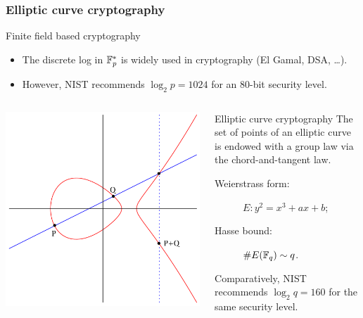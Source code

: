 \documentclass[10pt]{beamer}
\begin{document}
{
\begin{frame}
  \frametitle{Elliptic curve cryptography}

  \begin{block}{Finite field based cryptography}
    \begin{itemize}
    \item The discrete log in $\mathbb{F}_p^\ast$ is widely used in
      cryptography (El Gamal, DSA, \dots).
    \item However, NIST recommends $\log_2p=1024$
      for an 80-bit security level.
    \end{itemize}
  \end{block}

  \begin{columns}
    \begin{column}{0.4\textwidth}
      \includegraphics[width=\textwidth]{../isogeny/ec-add.pdf}
    \end{column}
    \begin{column}{0.6\textwidth}
      \begin{block}{Elliptic curve cryptography}
        The set of points of an elliptic curve is endowed with a group
        law via the chord-and-tangent law.
        
        \smallskip

        \begin{description}
        \item[Weierstrass form:] $E : y^2 = x^3 + ax + b$;
        \item[Hasse bound:] $\# E(\mathbb{F}_q) \sim q$.
        \end{description}

        \smallskip

        Comparatively, NIST recommends $\log_2q=160$ for the same
        security level.
      \end{block}
    \end{column}
  \end{columns}
\end{frame}
}
\end{document}
